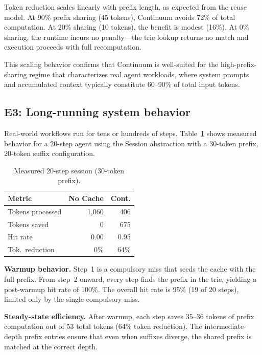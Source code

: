 \documentclass[10pt,twocolumn]{article}
\begin{document}
Token reduction scales linearly with prefix length, as expected from the reuse model. At 90\% prefix sharing (45 tokens), Continuum avoids 72\% of total computation. At 20\% sharing (10 tokens), the benefit is modest (16\%). At 0\% sharing, the runtime incurs no penalty---the trie lookup returns no match and execution proceeds with full recomputation.

This scaling behavior confirms that Continuum is well-suited for the high-prefix-sharing regime that characterizes real agent workloads, where system prompts and accumulated context typically constitute 60--90\% of total input tokens.

\subsection{E3: Long-running system behavior}

Real-world workflows run for tens or hundreds of steps. Table~\ref{tab:long-running} shows measured behavior for a 20-step agent using the Session abstraction with a 30-token prefix, 20-token suffix configuration.

\begin{table}[t]
\centering
{\small
\caption{Measured 20-step session (30-token prefix).}
\label{tab:long-running}
\begin{tabular}{@{}lrr@{}}
\toprule
\textbf{Metric} & \textbf{No Cache} & \textbf{Cont.} \\
\midrule
Tokens processed & 1,060 & 406 \\
Tokens saved     &     0 & 675 \\
Hit rate         & 0.00  & 0.95 \\
Tok.\ reduction  &  0\%  & 64\%  \\
\bottomrule
\end{tabular}
}
\end{table}

\textbf{Warmup behavior.} Step~1 is a compulsory miss that seeds the cache with the full prefix. From step~2 onward, every step finds the prefix in the trie, yielding a post-warmup hit rate of 100\%. The overall hit rate is 95\% (19 of 20 steps), limited only by the single compulsory miss.

\textbf{Steady-state efficiency.} After warmup, each step saves 35--36 tokens of prefix computation out of 53 total tokens (64\% token reduction). The intermediate-depth prefix entries ensure that even when suffixes diverge, the shared prefix is matched at the correct depth.
\end{document}
